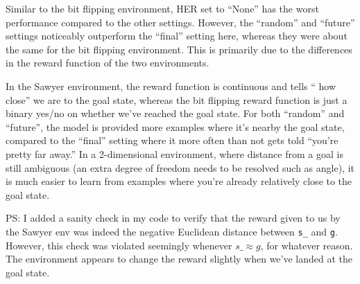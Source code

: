\documentclass[11pt]{article}
\begin{document}

Similar to the bit flipping environment, HER set to ``None'' has the worst performance compared to the other settings. However, the ``random'' and ``future'' settings noticeably outperform the ``final'' setting here, whereas they were about the same for the bit flipping environment. This is primarily due to the differences in the reward function of the two environments. 

In the Sawyer environment, the reward function is continuous and tells `` how close'' we are to the goal state, whereas the bit flipping reward function is just a binary yes/no on whether we've reached the goal state. For both ``random'' and ``future'', the model is provided more examples where it's nearby the goal state, compared to the ``final'' setting where it more often than not gets told ``you're pretty far away.'' In a 2-dimensional environment, where distance from a goal is still ambiguous (an extra degree of freedom needs to be resolved such as angle), it is much easier to learn from examples where you're already relatively close to the goal state.


PS: I added a sanity check in my code to verify that the reward given to us by the Sawyer env was indeed the negative Euclidean distance between \texttt{s\_} and \texttt{g}. However, this check was violated seemingly whenever $s\_ \approx g$, for whatever reason. The environment appears to change the reward slightly when we've landed at the goal state. 
\end{document}
